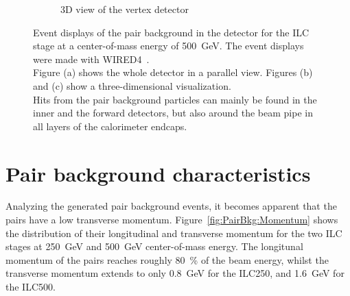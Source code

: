 \begin{figure}[h]
\begin{subfigure}[b]{0.3\textwidth}
   \caption{3D view of the vertex detector}
   \end{subfigure}
   \caption[Pair background event displays]{Event displays of the pair background in the 
   \sid detector for the ILC stage at a center-of-mass energy of \SI[detect-all]{500}{\GeV}. 
   The event displays were made with WIRED4~\cite{Wired4}.
   \\Figure (a) shows the whole \sid detector in a parallel view.
   Figures (b) and (c) show a three-dimensional visualization.
   \\Hits from the pair background particles can mainly be found in the inner and the forward detectors, but also around the beam pipe in all layers of the calorimeter endcaps.
   }
   \label{fig:PairBkg:wired4}
 \end{figure}

\section{Pair background characteristics}
\label{PairBkg:helix}
Analyzing the generated pair background events, it becomes apparent that the \positron\electron pairs have a low transverse momentum.
Figure~\ref{fig:PairBkg:Momentum} shows the distribution of their longitudinal and transverse momentum for the two ILC stages at \SI{250}{\GeV} and \SI{500}{\GeV} center-of-mass energy.
The longitunal momentum of the \positron\electron pairs reaches roughly \SI{80}{\percent} of the beam energy, whilst the transverse momentum extends to only \SI{0.8}{\GeV} for the ILC250, and \SI{1.6}{\GeV} for the ILC500.
